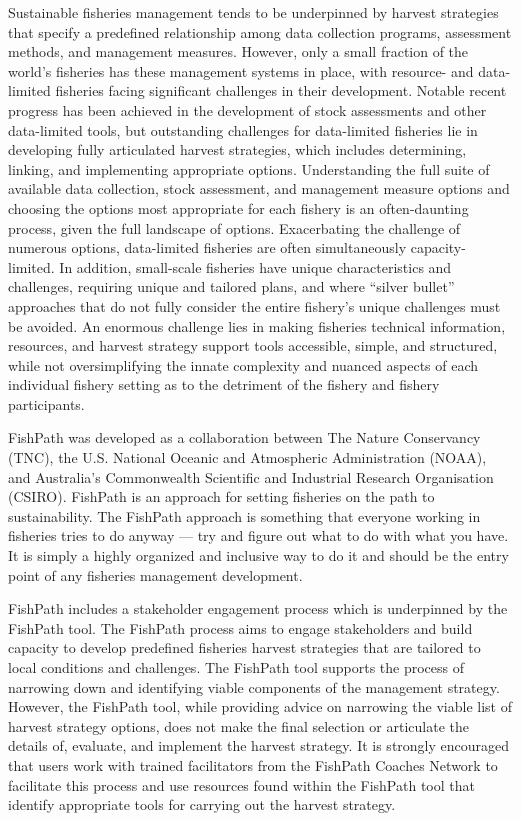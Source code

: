 \documentclass[11pt,]{book}
\begin{document}
Sustainable fisheries management tends to be underpinned by harvest
strategies that specify a predefined relationship among data collection
programs, assessment methods, and management measures. However, only a
small fraction of the world's fisheries has these management systems in
place, with resource- and data-limited fisheries facing significant
challenges in their development. Notable recent progress has been
achieved in the development of stock assessments and other data-limited
tools, but outstanding challenges for data-limited fisheries lie in
developing fully articulated harvest strategies, which includes
determining, linking, and implementing appropriate options.
Understanding the full suite of available data collection, stock
assessment, and management measure options and choosing the options most
appropriate for each fishery is an often-daunting process, given the
full landscape of options. Exacerbating the challenge of numerous
options, data-limited fisheries are often simultaneously
capacity-limited. In addition, small-scale fisheries have unique
characteristics and challenges, requiring unique and tailored plans, and
where ``silver bullet'' approaches that do not fully consider the entire
fishery's unique challenges must be avoided. An enormous challenge lies
in making fisheries technical information, resources, and harvest
strategy support tools accessible, simple, and structured, while not
oversimplifying the innate complexity and nuanced aspects of each
individual fishery setting as to the detriment of the fishery and
fishery participants.

FishPath was developed as a collaboration between The Nature Conservancy
(TNC), the U.S. National Oceanic and Atmospheric Administration (NOAA),
and Australia's Commonwealth Scientific and Industrial Research
Organisation (CSIRO). FishPath is an approach for setting fisheries on
the path to sustainability. The FishPath approach is something that
everyone working in fisheries tries to do anyway --- try and figure out
what to do with what you have. It is simply a highly organized and
inclusive way to do it and should be the entry point of any fisheries
management development.

FishPath includes a stakeholder engagement process which is underpinned
by the FishPath tool. The FishPath process aims to engage stakeholders
and build capacity to develop predefined fisheries harvest strategies
that are tailored to local conditions and challenges. The FishPath tool
supports the process of narrowing down and identifying viable components
of the management strategy. However, the FishPath tool, while providing
advice on narrowing the viable list of harvest strategy options, does
not make the final selection or articulate the details of, evaluate, and
implement the harvest strategy. It is strongly encouraged that users
work with trained facilitators from the FishPath Coaches Network to
facilitate this process and use resources found within the FishPath tool
that identify appropriate tools for carrying out the harvest strategy.
\end{document}
